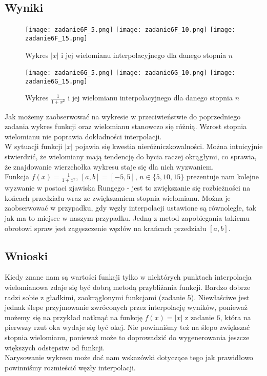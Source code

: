 \documentclass[10pt,a4paper, polish]{article}
\begin{document}
\subsection*{Wyniki}
		\begin{figure}[h]
			\centering
			\texttt{[image: zadanie6F\_5.png]}
			\texttt{[image: zadanie6F\_10.png]}
			\texttt{[image: zadanie6F\_15.png]}
  		\caption{Wykres $|x|$ i jej wielomianu interpolacyjnego dla danego stopnia $n$}
  		\end{figure}		
		
		\begin{figure}[h]
			\centering
			\texttt{[image: zadanie6G\_5.png]}
			\texttt{[image: zadanie6G\_10.png]}
			\texttt{[image: zadanie6G\_15.png]}
  		\caption{Wykres $\frac{1}{1+x^2}$ i jej wielomianu interpolacyjnego dla danego stopnia $n$}
  		\end{figure}	
Jak możemy zaobserwować na wykresie w przeciwieństwie do poprzedniego zadania wykres funkcji oraz wielomianu stanowczo się różnią. Wzrost stopnia wielomianu nie poprawia dokładności interpolacji.\\
W sytuacji funkcji $|x|$ pojawia się kwestia nieróżniczkowalności. Można intuicyjnie stwierdzić, że wielomiany mają tendencję do bycia raczej okrągłymi, co sprawia, że znajdowanie wierzchołka wykresu staje się dla nich wyzwaniem.\\
Funkcja $f(x) = \frac{1}{1+x^2}$, $[a, b] = [-5,5]$, $n \in \{5,10,15\}$ prezentuje nam kolejne wyzwanie w postaci zjawiska Rungego - jest to zwiększanie się rozbieżności na końcach przedziału wraz ze zwiększaniem stopnia wielomianu. Można je zaobserwować w przypadku, gdy węzły interpolacji ustawione są równolegle, tak jak ma to miejsce w naszym przypadku. Jedną z metod zapobiegania takiemu obrotowi spraw jest zagęszczenie węzłów na krańcach przedziału $[a,b]$.
\subsection{Wnioski}
Kiedy znane nam są wartości funkcji tylko w niektórych punktach interpolacja wielomianowa zdaje się być dobrą metodą przybliżania funkcji. Bardzo dobrze radzi sobie z gładkimi, zaokrąglonymi funkcjami (zadanie 5). Niewłaściwe jest jednak ślepe przyjmowanie zwróconych przez interpolację wyników, ponieważ możemy się na przykład natknąć na funkcję $f(x) = |x|$ z zadanie 6, która na pierwszy rzut oka wydaje się być okej. Nie powinniśmy też na ślepo zwiększać stopnia wielomianu, ponieważ może to doprowadzić do wygenerowania jeszcze większych odstępstw od funkcji.\\
Narysowanie wykresu może dać nam wskazówki dotyczące tego jak prawidłowo powinniśmy rozmieścić węzły interpolacji.
\end{document}

